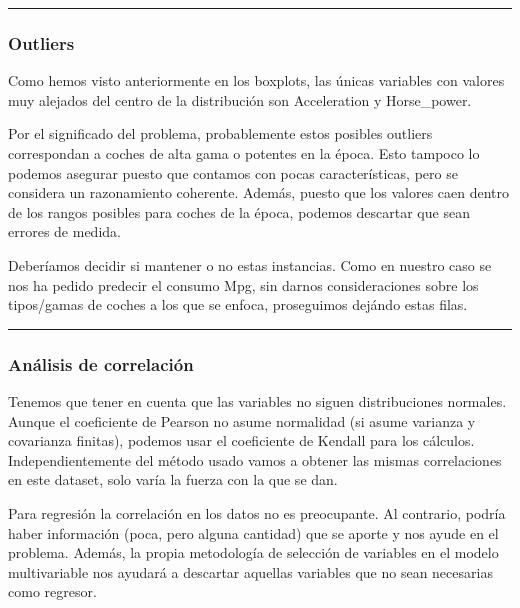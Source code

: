 \documentclass[
]{article}
\begin{document}
\begin{center}\rule{0.5\linewidth}{0.5pt}\end{center}

\hypertarget{outliers}{%
\subsubsection{Outliers}\label{outliers}}

Como hemos visto anteriormente en los boxplots, las únicas variables con
valores muy alejados del centro de la distribución son Acceleration y
Horse\_power.

Por el significado del problema, probablemente estos posibles outliers
correspondan a coches de alta gama o potentes en la época. Esto tampoco
lo podemos asegurar puesto que contamos con pocas características, pero
se considera un razonamiento coherente. Además, puesto que los valores
caen dentro de los rangos posibles para coches de la época, podemos
descartar que sean errores de medida.

Deberíamos decidir si mantener o no estas instancias. Como en nuestro
caso se nos ha pedido predecir el consumo Mpg, sin darnos
consideraciones sobre los tipos/gamas de coches a los que se enfoca,
proseguimos dejándo estas filas.

\begin{center}\rule{0.5\linewidth}{0.5pt}\end{center}

\hypertarget{anuxe1lisis-de-correlaciuxf3n}{%
\subsubsection{Análisis de
correlación}\label{anuxe1lisis-de-correlaciuxf3n}}

Tenemos que tener en cuenta que las variables no siguen distribuciones
normales. Aunque el coeficiente de Pearson no asume normalidad (si asume
varianza y covarianza finitas), podemos usar el coeficiente de Kendall
para los cálculos. Independientemente del método usado vamos a obtener
las mismas correlaciones en este dataset, solo varía la fuerza con la
que se dan.

Para regresión la correlación en los datos no es preocupante. Al
contrario, podría haber información (poca, pero alguna cantidad) que se
aporte y nos ayude en el problema. Además, la propia metodología de
selección de variables en el modelo multivariable nos ayudará a
descartar aquellas variables que no sean necesarias como regresor.
\end{document}
